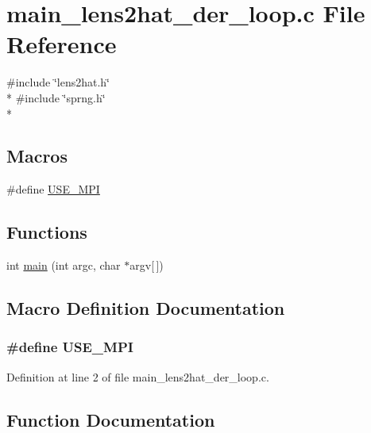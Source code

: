 \section{main\-\_\-lens2hat\-\_\-der\-\_\-loop.\-c File Reference}
\label{main__lens2hat__der__loop_8c}
{\ttfamily \#include \char`\"{}lens2hat.\-h\char`\"{}}\\*
{\ttfamily \#include \char`\"{}sprng.\-h\char`\"{}}\\*
\subsection*{Macros}
\begin{DoxyCompactItemize}
\item 
\#define \hyperlink{main__lens2hat__der__loop_8c_a3869d282031f6ea6b50fdb980b758420}{U\-S\-E\-\_\-\-M\-P\-I}
\end{DoxyCompactItemize}
\subsection*{Functions}
\begin{DoxyCompactItemize}
\item 
int \hyperlink{main__lens2hat__der__loop_8c_a0ddf1224851353fc92bfbff6f499fa97}{main} (int argc, char $\ast$argv\mbox{[}$\,$\mbox{]})
\end{DoxyCompactItemize}


\subsection{Macro Definition Documentation}
\subsubsection[{U\-S\-E\-\_\-\-M\-P\-I}]{\setlength{\rightskip}{0pt plus 5cm}\#define U\-S\-E\-\_\-\-M\-P\-I}\label{main__lens2hat__der__loop_8c_a3869d282031f6ea6b50fdb980b758420}


Definition at line 2 of file main\-\_\-lens2hat\-\_\-der\-\_\-loop.\-c.



\subsection{Function Documentation}
